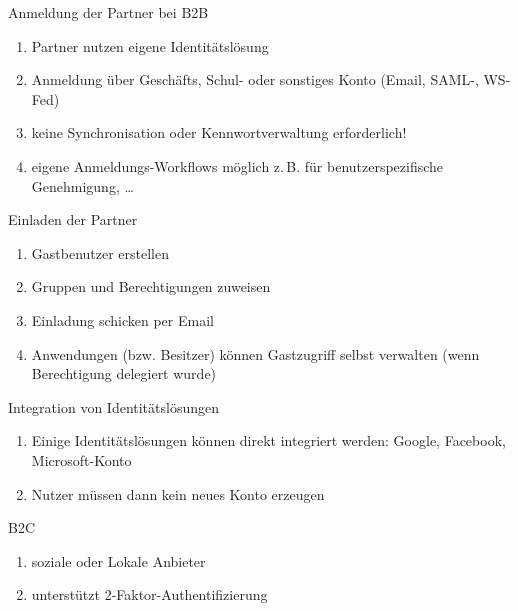 \begin{flashcard}[Definition]{Anmeldung der Partner bei B2B}
  \begin{enumerate}
    \item Partner nutzen eigene Identitätslösung
    \item Anmeldung über Geschäfts, Schul- oder sonstiges Konto\newline
    (Email, SAML-, WS-Fed)
    \item keine Synchronisation oder Kennwortverwaltung erforderlich!
    \item eigene Anmeldungs-Workflows möglich\newline
      z.\,B. für benutzerspezifische Genehmigung, \ldots
  \end{enumerate}
\end{flashcard}

\begin{flashcard}[Definition]{Einladen der Partner}
  \begin{enumerate}
    \item Gastbenutzer erstellen
    \item Gruppen und Berechtigungen zuweisen
    \item Einladung schicken per Email
    \item Anwendungen (bzw. Besitzer) können Gastzugriff selbst verwalten\newline
    (wenn Berechtigung delegiert wurde)
  \end{enumerate}
\end{flashcard}

\begin{flashcard}[Definition]{Integration von Identitätslösungen}
  \begin{enumerate}
    \item Einige Identitätslösungen können direkt integriert werden:\newline
    Google, Facebook, Microsoft-Konto
    \item Nutzer müssen dann kein neues Konto erzeugen
  \end{enumerate}
\end{flashcard}

\begin{flashcard}[]{B2C}
  \begin{enumerate}
    \item soziale oder Lokale Anbieter
    \item unterstützt 2-Faktor-Authentifizierung
  \end{enumerate}
\end{flashcard}
